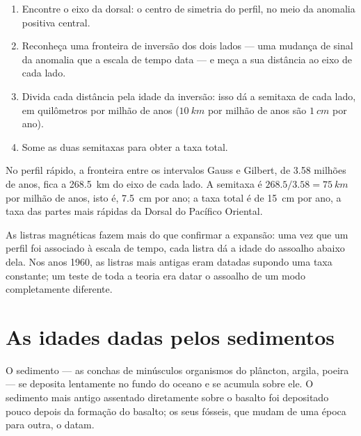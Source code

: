 \begin{method}\label{met:g11:drift-to-spreading:rate}
\begin{enumerate}
  \item Encontre o eixo da dorsal: o centro de simetria do perfil, no meio da
        anomalia positiva central.
  \item Reconheça uma fronteira de inversão dos dois lados --- uma mudança de
        sinal da anomalia que a escala de tempo data --- e meça a sua
        distância ao eixo de cada lado.
  \item Divida cada distância pela idade da inversão: isso dá a semitaxa de
        cada lado, em quilômetros por milhão de anos
        ($\qty{10}{km}$ por milhão de anos são $\qty{1}{cm}$ por ano).
  \item Some as duas semitaxas para obter a taxa total.
\end{enumerate}
\end{method}

\begin{example}\label{ex:g11:drift-to-spreading:fast}
No perfil rápido, a fronteira entre os intervalos Gauss e Gilbert, de
\num{3.58} milhões de anos, fica a \qty{268.5}{km} do eixo de cada lado. A
semitaxa é $268.5/3.58 = \qty{75}{km}$ por milhão de anos, isto é,
\qty{7.5}{cm} por ano; a taxa total é de \qty{15}{cm} por ano, a taxa das
partes mais rápidas da Dorsal do Pacífico Oriental.
\end{example}

As listras magnéticas fazem mais do que confirmar a expansão: uma vez que um
perfil foi associado à escala de tempo, cada listra dá a idade do assoalho
abaixo dela. Nos anos 1960, as listras mais antigas eram datadas supondo uma
taxa constante; um teste de toda a teoria era datar o assoalho de um modo
completamente diferente.

\section{As idades dadas pelos sedimentos}

O sedimento --- as conchas de minúsculos organismos do plâncton, argila,
poeira --- se deposita lentamente no fundo do oceano e se acumula sobre ele.
O sedimento mais antigo assentado diretamente sobre o basalto foi depositado
pouco depois da formação do basalto; os seus fósseis, que mudam de uma época
para outra, o datam.


